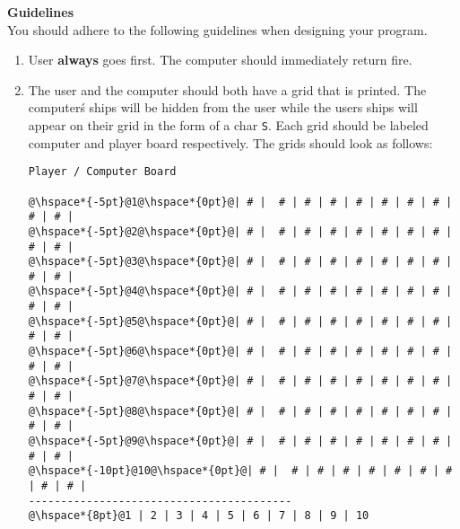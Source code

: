 \documentclass[12pt]{article}
\begin{document}
\vspace*{0.5cm}
\noindent\textbf{Guidelines}\\
You should adhere to the following guidelines when designing your program.
\begin{enumerate}
	\item User \textbf{always} goes first. The computer should immediately return fire.
	\item The user and the computer should both have a grid that is printed. The computer\' s ships will be hidden from the user while the users ships will appear on their grid in the form of a char \texttt{S}. Each grid should be labeled computer and player board respectively. The grids should look as follows:
\begin{center}
\begin{minipage}{8cm}
\begin{lstlisting}[frame=none, escapechar=@]
Player / Computer Board

@\hspace*{-5pt}@1@\hspace*{0pt}@| # |  # | # | # | # | # | # | # | # | # |
@\hspace*{-5pt}@2@\hspace*{0pt}@| # |  # | # | # | # | # | # | # | # | # |
@\hspace*{-5pt}@3@\hspace*{0pt}@| # |  # | # | # | # | # | # | # | # | # |
@\hspace*{-5pt}@4@\hspace*{0pt}@| # |  # | # | # | # | # | # | # | # | # |
@\hspace*{-5pt}@5@\hspace*{0pt}@| # |  # | # | # | # | # | # | # | # | # |
@\hspace*{-5pt}@6@\hspace*{0pt}@| # |  # | # | # | # | # | # | # | # | # |
@\hspace*{-5pt}@7@\hspace*{0pt}@| # |  # | # | # | # | # | # | # | # | # |
@\hspace*{-5pt}@8@\hspace*{0pt}@| # |  # | # | # | # | # | # | # | # | # |
@\hspace*{-5pt}@9@\hspace*{0pt}@| # |  # | # | # | # | # | # | # | # | # |
@\hspace*{-10pt}@10@\hspace*{0pt}@| # |  # | # | # | # | # | # | # | # | # |
-----------------------------------------
@\hspace*{8pt}@1 | 2 | 3 | 4 | 5 | 6 | 7 | 8 | 9 | 10


\end{lstlisting}
\end{minipage}
\end{center}
\end{enumerate}
\end{document}
